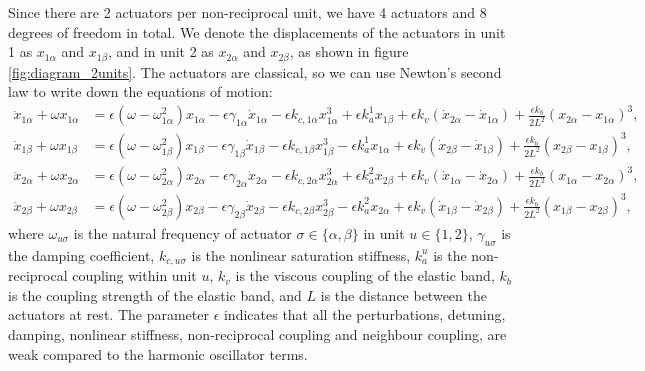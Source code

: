\documentclass[11pt, a4paper]{article} %
\begin{document}
Since there are 2 actuators per non-reciprocal unit, we have 4 actuators and 8 degrees of freedom in total. 
We denote the displacements of the actuators in unit 1 as $x_{1\alpha}$ and $x_{1\beta}$, and in unit 2 as $x_{2\alpha}$ and $x_{2\beta}$, 
as shown in figure \ref{fig:diagram_2units}. 
The actuators are classical, so we can use Newton's second law to write down the equations of motion:
\begin{equation}
\begin{aligned}
\ddot{x}_{1\alpha} + \omega x_{1\alpha} &= 
\epsilon(\omega - \omega_{1\alpha}^2) x_{1\alpha}
-\epsilon \gamma_{1\alpha} \dot{x}_{1\alpha}
- \epsilon k_{c,1\alpha} x_{1\alpha}^3
+ \epsilon k_a^{1} x_{1\beta} 
+ \epsilon k_v (\dot{x}_{2\alpha} - \dot{x}_{1\alpha})
+ \frac{\epsilon k_b}{2 L^2} (x_{2\alpha} - x_{1\alpha})^3, \\
\ddot{x}_{1\beta} + \omega x_{1\beta} &= 
\epsilon(\omega - \omega_{1\beta}^2) x_{1\beta}
-\epsilon \gamma_{1\beta} \dot{x}_{1\beta}
- \epsilon k_{c,1\beta} x_{1\beta}^3
- \epsilon k_a^{1} x_{1\alpha}
+ \epsilon k_v (\dot{x}_{2\beta} - \dot{x}_{1\beta})
+ \frac{\epsilon k_b}{2 L^2} (x_{2\beta} - x_{1\beta})^3, \\
\ddot{x}_{2\alpha} + \omega x_{2\alpha} &= 
\epsilon(\omega - \omega_{2\alpha}^2) x_{2\alpha}
-\epsilon \gamma_{2\alpha} \dot{x}_{2\alpha}
- \epsilon k_{c,2\alpha} x_{2\alpha}^3
+ \epsilon k_a^{2} x_{2\beta} 
+ \epsilon k_v (\dot{x}_{1\alpha} - \dot{x}_{2\alpha})
+ \frac{\epsilon k_b}{2 L^2} (x_{1\alpha} - x_{2\alpha})^3, \\
\ddot{x}_{2\beta} + \omega x_{2\beta} &= 
\epsilon(\omega - \omega_{2\beta}^2) x_{2\beta}
-\epsilon \gamma_{2\beta} \dot{x}_{2\beta}
- \epsilon k_{c,2\beta} x_{2\beta}^3
- \epsilon k_a^{2} x_{2\alpha}
+ \epsilon k_v (\dot{x}_{1\beta} - \dot{x}_{2\beta})
+ \frac{\epsilon k_b}{2 L^2} (x_{1\beta} - x_{2\beta})^3,
\end{aligned}
\label{eq:mse_eom_2units}
\end{equation}
where $\omega_{u\sigma}$ is the natural frequency of actuator $\sigma\in\{\alpha,\beta\}$ in unit $u\in\{1,2\}$, 
$\gamma_{u\sigma}$ is the damping coefficient, $k_{c,u\sigma}$ is the nonlinear saturation stiffness, 
$k_a^{u}$ is the non-reciprocal coupling within unit $u$, 
$k_v$ is the viscous coupling of the elastic band, $k_b$ is the coupling strength of the elastic band, and $L$ 
is the distance between the actuators at rest. The parameter $\epsilon$ indicates that all the perturbations, 
detuning, damping, nonlinear stiffness, non-reciprocal coupling and neighbour coupling, are weak compared to the harmonic oscillator terms.
\end{document}

